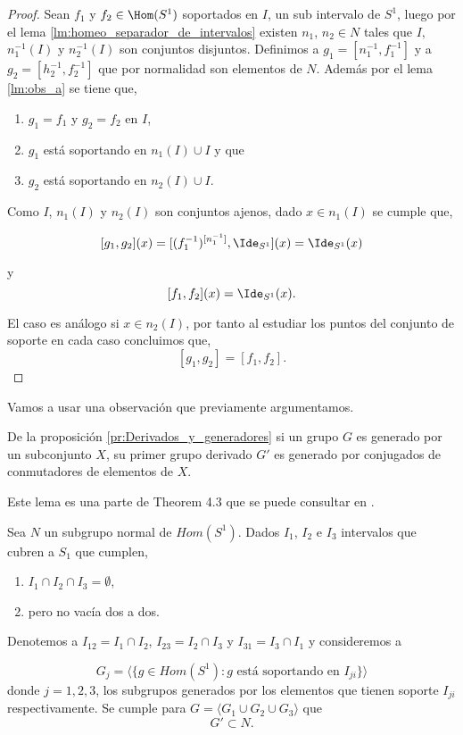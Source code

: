 \begin{proof}	
Sean $f_1$ y $f_2 \in \Hom(S^1)$  soportados en $I$, un sub intervalo de $S^1$, luego por el lema \ref{lm:homeo_separador_de_intervalos} existen  $n_1$, $n_2 \in N$ tales que $I,$ $n_1^{-1}(I)$ y $n_2^{-1}(I)$ son conjuntos disjuntos. Definimos a  $g_1=[n_1^{-1},f_1^{-1}]$ y a $g_2=[h_2^{-1},f_2^{-1}]$ que por  normalidad  son elementos de  $N$. Además por el lema \ref{lm:obs_a} se tiene que,

    \begin{enumerate}
        \item $g_1=f_1$  y $g_2=f_2$ en  $I$, 
        \item $g_1$ está soportando en $n_1(I) \cup I$ y que 
        \item  $g_2$ está soportando en $n_2(I) \cup I$.
    \end{enumerate} 

Como $I$, $n_1(I)$ y $n_2(I)$ son conjuntos ajenos, dado $x \in n_1(I)$ se cumple que, 

$$[g_1,g_2](x)=[(f_1^{-1})^{[n_1^{-1}]},\Ide_{S^1}](x)=\Ide_{S^1}(x)$$

y $$[f_1,f_2](x)=\Ide_{S^1}(x).$$

El caso es análogo si $x \in n_2(I)$, por tanto al estudiar los puntos del conjunto de soporte  en cada caso concluimos que,
$$[g_1,g_2]=[f_1,f_2].$$
\end{proof}

Vamos a usar una observación que previamente argumentamos.

\begin{ob} 
De la proposición \ref{pr:Derivados_y_generadores} si un grupo $G$ es generado por un subconjunto $X$, su primer grupo derivado $G'$ es generado por conjugados de conmutadores de elementos de $X$.
\end{ob}

Este lema es una parte de Theorem 4.3 que se puede consultar en \cite{ander}.

\begin{lm}\label{lm:tres}
Sea $N$ un subgrupo normal de  $Hom(S^1)$. Dados  $I_1$, $I_2$ e $I_3$ intervalos que cubren a $S_1$ que cumplen,

\begin{enumerate}
	\item   $I_1 \cap I_2 \cap I_3=\emptyset$,
	\item pero no vacía dos a dos.
\end{enumerate} 
Denotemos a $I_{12}=I_1 \cap I_2$, $I_{23}=I_2 \cap I_3$ y  $I_{31}=I_3 \cap I_1$   y consideremos a 

 $$G_j=\langle \{g \in Hom(S^1): g \text{ está soportando en } I_{ji}\} \rangle$$ 
donde $j=1,2, 3$, los subgrupos generados por los elementos que tienen soporte $I_{ji}$ respectivamente. Se cumple para $G= \langle G_1 \cup G_2 \cup G_3 \rangle$ que $$G' \subset N.$$
\end{lm}

